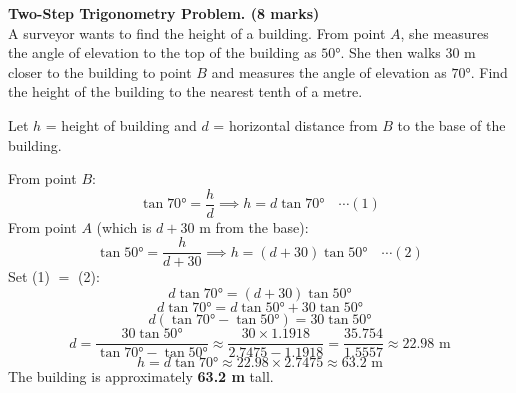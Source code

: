 \documentclass[addpoints]{exam}
\begin{document}
\begin{questions}

\question \textbf{Two-Step Trigonometry Problem. (8 marks)}\\
A surveyor wants to find the height of a building. From point $A$, she measures the angle of elevation to the top of the building as $50°$. She then walks 30 m closer to the building to point $B$ and measures the angle of elevation as $70°$. Find the height of the building to the nearest tenth of a metre.

\begin{solution}[12cm]
Let $h$ = height of building and $d$ = horizontal distance from $B$ to the base of the building.

From point $B$:
\[
\tan 70° = \frac{h}{d} \implies h = d\tan 70°  \quad \cdots (1)
\]
From point $A$ (which is $d + 30$ m from the base):
\[
\tan 50° = \frac{h}{d + 30} \implies h = (d + 30)\tan 50°  \quad \cdots (2)
\]
Set (1) $=$ (2):
\[
d\tan 70° = (d + 30)\tan 50°
\]
\[
d\tan 70° = d\tan 50° + 30\tan 50°
\]
\[
d(\tan 70° - \tan 50°) = 30\tan 50°
\]
\[
d = \frac{30\tan 50°}{\tan 70° - \tan 50°} \approx \frac{30 \times 1.1918}{2.7475 - 1.1918} = \frac{35.754}{1.5557} \approx 22.98 \text{ m}
\]
\[
h = d\tan 70° \approx 22.98 \times 2.7475 \approx 63.2 \text{ m}
\]
The building is approximately \textbf{63.2 m} tall.
\end{solution}

\end{questions}
\end{document}
